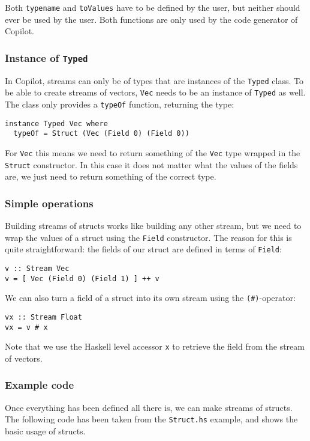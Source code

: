 Both \texttt{typename} and \texttt{toValues} have to be defined by the user,
but neither should ever be used by the user. Both functions are only used by
the code generator of Copilot.


\subsubsection*{Instance of \texttt{Typed}}
In Copilot, streams can only be of types that are instances of the \texttt{Typed}
class. To be able to create streams of vectors, \texttt{Vec} needs to be an
instance of \texttt{Typed} as well. The class only provides a \texttt{typeOf}
function, returning the type:
\begin{lstlisting}[language=Copilot]
instance Typed Vec where
  typeOf = Struct (Vec (Field 0) (Field 0))
\end{lstlisting}
For \texttt{Vec} this means we need to return something of the \texttt{Vec}
type wrapped in the \texttt{Struct} constructor. In this case it does not
matter what the values of the fields are, we just need to return something of
the correct type.


\subsubsection*{Simple operations}
Building streams of structs works like building any other stream, but we need
to wrap the values of a struct using the \texttt{Field} constructor. The reason
for this is quite straightforward: the fields of our struct are defined in
terms of \texttt{Field}:
\begin{lstlisting}[language=Copilot]
v :: Stream Vec
v = [ Vec (Field 0) (Field 1) ] ++ v
\end{lstlisting}

We can also turn a field of a struct into its own stream using the
\texttt{(\#)}-operator:
\begin{lstlisting}[language=Copilot]
vx :: Stream Float
vx = v # x
\end{lstlisting}
Note that we use the Haskell level accessor \texttt{x} to retrieve the field
from the stream of vectors.


\subsubsection*{Example code}
\label{exm:struct}
Once everything has been defined all there is, we can make streams of structs. The following
code has been taken from the \texttt{Struct.hs} example, and shows the basic
usage of structs.
%

%

